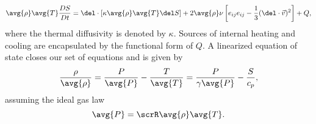 \documentclass[12pt,letterpaper]{article}
\begin{document}
\begin{equation} %
  \label{eq:entropytwo}
  \begin{split}
  \avg{\rho}\avg{T}\frac{DS}{Dt} = %
  \del \cdot [\kappa \avg{\rho} \avg{T} \del S] %
                    + 2 \avg{\rho}\nu \left[e_{ij}e_{ij} - \frac{1}{3}(\del \cdot
\vec{v})^2\right]+Q,
  \end{split}
\end{equation}
where the thermal diffusivity is denoted by $\kappa$.  Sources of internal heating and cooling are encapsulated by the functional form of $Q$.  A linearized equation of state closes our set of equations and is given by
\begin{equation} %
  \frac{\rho}{\avg{\rho}} = \frac{P}{\avg{P}} - \frac{T}{\avg{T}}
    =  \frac{P}{\gamma \avg{P}} - \frac{S}{c_p},
\end{equation}
assuming the ideal gas law
\begin{equation} %
  \avg{P} = \scrR \avg{\rho} \avg{T}.
\end{equation}
\end{document}
